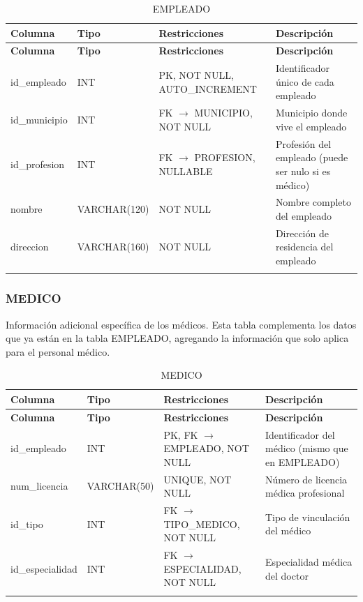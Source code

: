 \documentclass[12pt,a4paper]{article}
\begin{document}
{\small\begin{longtable}{|p{2.3cm}|p{3.3cm}|p{4.2cm}|p{4.2cm}|}
\hline
\textbf{Columna} & \textbf{Tipo} & \textbf{Restricciones} & \textbf{Descripci\'on} \\ \hline
\endfirsthead
\hline
\textbf{Columna} & \textbf{Tipo} & \textbf{Restricciones} & \textbf{Descripci\'on} \\ \hline
\endhead
id\_empleado & INT & PK, NOT NULL, AUTO\_INCREMENT & Identificador \'unico de cada empleado \\ \hline
id\_municipio & INT & FK $\rightarrow$ MUNICIPIO, NOT NULL & Municipio donde vive el empleado \\ \hline
id\_profesion & INT & FK $\rightarrow$ PROFESION, NULLABLE & Profesi\'on del empleado (puede ser nulo si es m\'edico) \\ \hline
nombre & VARCHAR(120) & NOT NULL & Nombre completo del empleado \\ \hline
direccion & VARCHAR(160) & NOT NULL & Direcci\'on de residencia del empleado \\ \hline
\caption{EMPLEADO}
\end{longtable}}

\subsubsection{MEDICO}
Informaci\'on adicional espec\'ifica de los m\'edicos. Esta tabla complementa los datos que ya est\'an en la tabla EMPLEADO, agregando la informaci\'on que solo aplica para el personal m\'edico.

{\small\begin{longtable}{|p{2.3cm}|p{3.3cm}|p{4.2cm}|p{4.2cm}|}
\hline
\textbf{Columna} & \textbf{Tipo} & \textbf{Restricciones} & \textbf{Descripci\'on} \\ \hline
\endfirsthead
\hline
\textbf{Columna} & \textbf{Tipo} & \textbf{Restricciones} & \textbf{Descripci\'on} \\ \hline
\endhead
id\_empleado & INT & PK, FK $\rightarrow$ EMPLEADO, NOT NULL & Identificador del m\'edico (mismo que en EMPLEADO) \\ \hline
num\_licencia & VARCHAR(50) & UNIQUE, NOT NULL & N\'umero de licencia m\'edica profesional \\ \hline
id\_tipo & INT & FK $\rightarrow$ TIPO\_MEDICO, NOT NULL & Tipo de vinculaci\'on del m\'edico \\ \hline
id\_especialidad & INT & FK $\rightarrow$ ESPECIALIDAD, NOT NULL & Especialidad m\'edica del doctor \\ \hline
\caption{MEDICO}
\end{longtable}}
\end{document}
